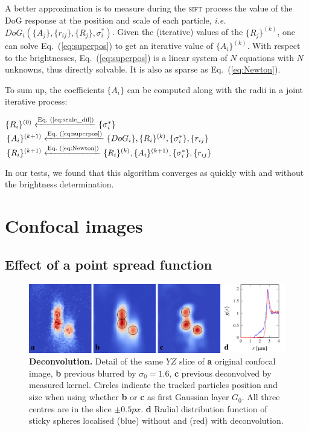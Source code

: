 \documentclass[8.5pt,twoside,twocolumn]{article}
\begin{document}
A better approximation is to measure during the \textsc{sift} process the value of the DoG response at the position and scale of each particle, \emph{i.e.} $DoG_i(\lbrace A_j\rbrace, \lbrace r_{ij}\rbrace, \lbrace R_j\rbrace, \sigma_i^*)$. Given the (iterative) values of the $\lbrace R_j\rbrace^{(k)}$, one can solve Eq.~(\ref{eq:superpos}) to get an iterative value of $\lbrace A_i\rbrace^{(k)}$. With respect to the brightnesses, Eq.~(\ref{eq:superpos}) is a linear system of $N$ equations with $N$ unknowns, thus directly solvable. It is also as sparse as Eq.~(\ref{eq:Newton}).

To sum up, the coefficients $\lbrace A_i\rbrace$ can be computed along with the radii in a joint iterative process:
\begin{algorithmic}
\State $\lbrace R_i\rbrace^{(0)} \xleftarrow{\text{Eq.~(\ref{eq:scale_dil})}} \lbrace \sigma_i^*\rbrace$
\Repeat 
	\State $\lbrace A_i\rbrace^{(k+1)} \xleftarrow{\text{Eq.~(\ref{eq:superpos})}} \lbrace DoG_i \rbrace, \lbrace R_i\rbrace^{(k)}, \lbrace \sigma_i^*\rbrace, \lbrace r_{ij}\rbrace$
	\State $\lbrace R_i\rbrace^{(k+1)} \xleftarrow{\text{Eq.~(\ref{eq:Newton})}} \lbrace R_i\rbrace^{(k)}, \lbrace A_i\rbrace^{(k+1)}, \lbrace \sigma_i^*\rbrace, \lbrace r_{ij}\rbrace$ 
\end{algorithmic}

In our tests, we found that this algorithm converges as quickly with and without the brightness determination.

\section{Confocal images}
\label{sec:confocal}

\subsection{Effect of a point spread function}
\begin{figure}
\centering
\includegraphics{fig_deconv.pdf}
	\caption{\textbf{Deconvolution.} Detail of the same $YZ$ slice of \textbf{a} original confocal image, \textbf{b} previous blurred by $\sigma_0=1.6$, \textbf{c} previous deconvolved by measured kernel. Circles indicate the tracked particles position and size when using whether \textbf{b} or \textbf{c} as first Gaussian layer $G_0$. All three centres are in the slice $\pm \unit{0.5}{px}$. \textbf{d} Radial distribution function of sticky spheres localised (blue) without and (red) with deconvolution.}
	\label{fig:deconv}
\end{figure}
\end{document}
